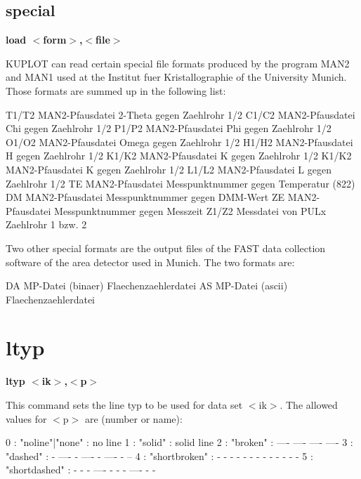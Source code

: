 \subsection*{special}
{\bf load $ <$form$> $,$ <$file$> $ \par }
\par
\vspace{3pt}
KUPLOT can read certain special file formats produced by the program 
MAN2 and MAN1 used at the Institut fuer Kristallographie of the 
University Munich. Those formats are summed up in the following 
list: 
\par
\begin{MacVerbatim}
T1/T2   MAN2-Pfausdatei            2-Theta gegen Zaehlrohr 1/2
C1/C2   MAN2-Pfausdatei            Chi     gegen Zaehlrohr 1/2
P1/P2   MAN2-Pfausdatei            Phi     gegen Zaehlrohr 1/2
O1/O2   MAN2-Pfausdatei            Omega   gegen Zaehlrohr 1/2
H1/H2   MAN2-Pfausdatei            H gegen Zaehlrohr 1/2
K1/K2   MAN2-Pfausdatei            K gegen Zaehlrohr 1/2
K1/K2   MAN2-Pfausdatei            K gegen Zaehlrohr 1/2
L1/L2   MAN2-Pfausdatei            L gegen Zaehlrohr 1/2
 TE     MAN2-Pfausdatei            Messpunktnummer gegen Temperatur (822)
 DM     MAN2-Pfausdatei            Messpunktnummer gegen DMM-Wert
 ZE     MAN2-Pfausdatei            Messpunktnummer gegen Messzeit
Z1/Z2   Messdatei von PULx         Zaehlrohr 1 bzw. 2
\end{MacVerbatim}
Two other special formats are the output files of the FAST data 
collection software of the area detector used in Munich. The two 
formats are: 
\par
\begin{MacVerbatim}
 DA     MP-Datei (binaer)          Flaechenzaehlerdatei
 AS     MP-Datei (ascii)           Flaechenzaehlerdatei
\end{MacVerbatim}
\section{ltyp}
{\bf ltyp $ <$ik$> $,$ <$p$> $ \par }
\par
\vspace{3pt}
This command sets the line typ to be used for data set $ <$ik$> $. The 
allowed values for $ <$p$> $ are (number or name): 
\par
\begin{MacVerbatim}
  0 : {"noline"|"none"} : no line
  1 : {"solid"}         : solid line
  2 : {"broken"}        : ----   ----   ----   ----
  3 : {"dashed"}        : - ---- - ---- - ---- - --
  4 : {"shortbroken"}   : - - - - - - - - - - - - -
  5 : {"shortdashed"}   : - - - ---- - - - ---- - -
\end{MacVerbatim}
